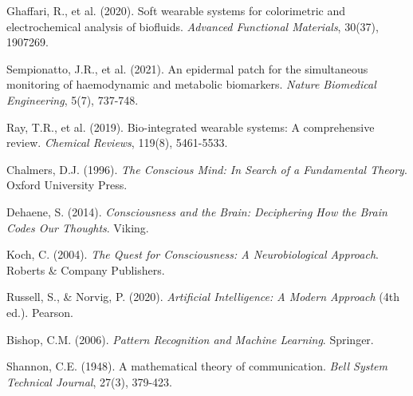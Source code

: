 \documentclass[12pt,a4paper]{article}
\begin{document}
\begin{thebibliography}{99}
Ghaffari, R., et al. (2020). Soft wearable systems for colorimetric and electrochemical analysis of biofluids. \textit{Advanced Functional Materials}, 30(37), 1907269.

Sempionatto, J.R., et al. (2021). An epidermal patch for the simultaneous monitoring of haemodynamic and metabolic biomarkers. \textit{Nature Biomedical Engineering}, 5(7), 737-748.

Ray, T.R., et al. (2019). Bio-integrated wearable systems: A comprehensive review. \textit{Chemical Reviews}, 119(8), 5461-5533.

Chalmers, D.J. (1996). \textit{The Conscious Mind: In Search of a Fundamental Theory}. Oxford University Press.

Dehaene, S. (2014). \textit{Consciousness and the Brain: Deciphering How the Brain Codes Our Thoughts}. Viking.

Koch, C. (2004). \textit{The Quest for Consciousness: A Neurobiological Approach}. Roberts \& Company Publishers.

Russell, S., & Norvig, P. (2020). \textit{Artificial Intelligence: A Modern Approach} (4th ed.). Pearson.

Bishop, C.M. (2006). \textit{Pattern Recognition and Machine Learning}. Springer.

Shannon, C.E. (1948). A mathematical theory of communication. \textit{Bell System Technical Journal}, 27(3), 379-423.

\end{thebibliography}
\end{document}
